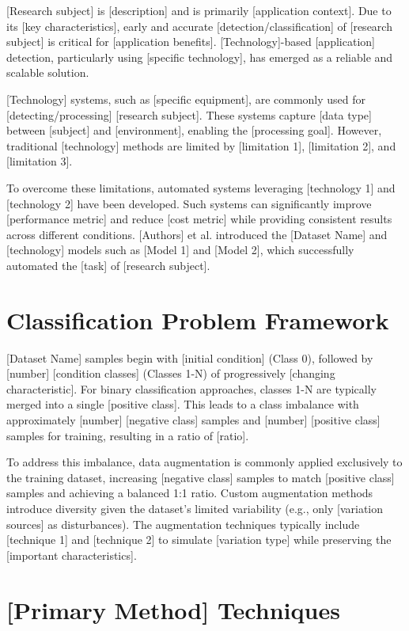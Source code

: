 [Research subject] is [description] and is primarily [application context]. Due to its [key characteristics], early and accurate [detection/classification] of [research subject] is critical for [application benefits]. [Technology]-based [application] detection, particularly using [specific technology], has emerged as a reliable and scalable solution.

[Technology] systems, such as [specific equipment], are commonly used for [detecting/processing] [research subject]. These systems capture [data type] between [subject] and [environment], enabling the [processing goal]. However, traditional [technology] methods are limited by [limitation 1], [limitation 2], and [limitation 3].

To overcome these limitations, automated systems leveraging [technology 1] and [technology 2] have been developed. Such systems can significantly improve [performance metric] and reduce [cost metric] while providing consistent results across different conditions. [Authors] et al. introduced the [Dataset Name] and [technology] models such as [Model 1] and [Model 2], which successfully automated the [task] of [research subject].

\section{Classification Problem Framework}

[Dataset Name] samples begin with [initial condition] (Class 0), followed by [number] [condition classes] (Classes 1-N) of progressively [changing characteristic]. For binary classification approaches, classes 1-N are typically merged into a single [positive class]. This leads to a class imbalance with approximately [number] [negative class] samples and [number] [positive class] samples for training, resulting in a ratio of [ratio].

To address this imbalance, data augmentation is commonly applied exclusively to the training dataset, increasing [negative class] samples to match [positive class] samples and achieving a balanced 1:1 ratio. Custom augmentation methods introduce diversity given the dataset's limited variability (e.g., only [variation sources] as disturbances). The augmentation techniques typically include [technique 1] and [technique 2] to simulate [variation type] while preserving the [important characteristics].

\section{[Primary Method] Techniques}

